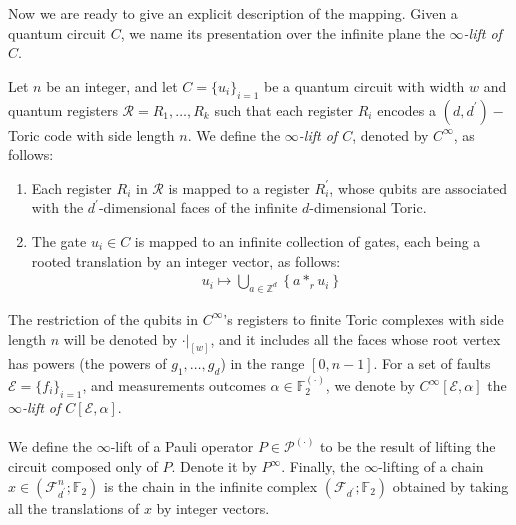 Now we are ready to give an explicit description of the mapping. Given a quantum circuit $C$, we name its presentation over the infinite plane the \textit{$\infty$-lift of $C$}.
\begin{definition}
  \label{def:extension}
  Let $n$ be an integer, and let $C = \{u_{i}\}_{i=1}$ be a quantum circuit with width $w$ and quantum registers $\mathcal{R} = R_{1}, \ldots, R_{k}$ such that each register $R_{i}$ encodes a $(d,d^{\prime})- $Toric code with side length $n$. We define the \textit{$\infty$-lift of $C$}, denoted by $C^{\infty}$, as follows:
  \begin{enumerate}
    \item Each register $R_{i}$ in $\mathcal{R}$ is mapped to a register $R^{\prime}_{i}$, whose qubits are associated with the $d^{\prime}$-dimensional faces of the infinite $d$-dimensional Toric. 
    \item The gate $u_{i} \in C$ is mapped to an infinite collection of gates, each being a rooted translation by an integer vector, as follows:
      \begin{equation*}
        \begin{split}
          u_{i}  \mapsto  \bigcup_{ a \in \mathbb{Z}^{d} } \left\{ a *_{r} u_{i} \right\} 
        \end{split}
      \end{equation*}
  \end{enumerate}
  The restriction of the qubits in $C^{\infty}$'s registers to finite Toric complexes with side length $n$ will be denoted by $\cdot |_{[w]}$, and it includes all the faces whose root vertex has powers (the powers of $g_{1}, \ldots, g_{d}$) in the range $[0, n-1]$. For a set of faults $\mathcal{E} = \{ f_{i} \}_{i=1}$, and measurements outcomes $\alpha \in \mathbb{F}_2^{(\cdot)}$, we denote by $C^{\infty}[\mathcal{E},\alpha]$ the \textit{$\infty$-lift of $C[\mathcal{E},\alpha]$}. 
  \paragraph{ }
We define the $\infty$-lift of a Pauli operator $P \in \mathcal{P}^{(\cdot)}$ to be the result of lifting the circuit composed only of $P$. Denote it by $P^{\infty}$. Finally, the $\infty$-lifting of a chain $x \in (\mathcal{F}^{n}_{d^{\prime}}; \mathbb{F}_{2})$ is the chain in the infinite complex $(\mathcal{F}_{d^{\prime}}; \mathbb{F}_{2})$ obtained by taking all the translations of $x$ by integer vectors.
\end{definition}



